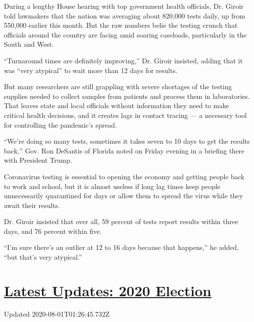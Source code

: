 During a lengthy House hearing with top government health officials, Dr.
Giroir told lawmakers that the nation was averaging about 820,000 tests
daily, up from 550,000 earlier this month. But the raw numbers belie the
testing crunch that officials around the country are facing amid soaring
caseloads, particularly in the South and West.

``Turnaround times are definitely improving,'' Dr. Giroir insisted,
adding that it was ``very atypical'' to wait more than 12 days for
results.

But many researchers are still grappling with severe shortages of the
testing supplies needed to collect samples from patients and process
them in laboratories. That leaves state and local officials without
information they need to make critical health decisions, and it creates
lags in contact tracing --- a necessary tool for controlling the
pandemic's spread.

``We're doing so many tests, sometimes it takes seven to 10 days to get
the results back,'' Gov. Ron DeSantis of Florida noted on Friday evening
in a briefing there with President Trump.

Coronavirus testing is essential to opening the economy and getting
people back to work and school, but it is almost useless if long lag
times keep people unnecessarily quarantined for days or allow them to
spread the virus while they await their results.

Dr. Giroir insisted that over all, 59 percent of tests report results
within three days, and 76 percent within five.

``I'm sure there's an outlier at 12 to 16 days because that happens,''
he added, ``but that's very atypical.''

\hypertarget{latest-updates-2020-election}{%
\section{\texorpdfstring{\href{https://www.nytimes3xbfgragh.onion/2020/07/31/us/elections/biden-vs-trump.html?action=click\&pgtype=Article\&state=default\&region=MAIN_CONTENT_1\&context=storylines_live_updates}{Latest
Updates: 2020
Election}}{Latest Updates: 2020 Election}}\label{latest-updates-2020-election}}

Updated 2020-08-01T01:26:45.732Z

